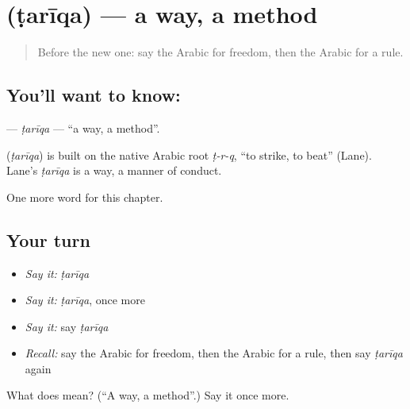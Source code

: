 \section[\texorpdfstring{\ar{طريقة} (ṭarīqa)}{طريقة (ṭarīqa)}]{ (ṭarīqa) — a way, a method}

\label{lesson:AR-C208-tariqa}



\begin{quote}
Before the new one: say the Arabic for freedom, then the Arabic for a rule.
\end{quote}

\subsection*{You'll want to know: }
\textbf{} — \emph{ṭarīqa} — \textquotedblleft{}a way, a method\textquotedblright{}.

\begin{cousinweb}
\textbf{} (\emph{ṭarīqa}) is built on the native Arabic root \emph{ṭ-r-q}, \textquotedblleft{}to strike, to beat\textquotedblright{} (Lane). Lane's \emph{ṭarīqa} is a way, a manner of conduct.
\end{cousinweb}

\begin{grammarlens}[title={What you've built}]
One more word for this chapter.
\end{grammarlens}

\subsection*{Your turn}
\begin{itemize}
\raggedright
  \item \emph{Say it:} \emph{ṭarīqa}
  \item \emph{Say it:} \emph{ṭarīqa}, once more
  \item \emph{Say it:} say \emph{ṭarīqa}
  \item \emph{Recall:} say the Arabic for freedom, then the Arabic for a rule, then say \emph{ṭarīqa} again
\end{itemize}

\begin{tcolorbox}[breakable,colback=teal!4,colframe=teal!35!black,title={Before you move on}]
What does  mean? (\textquotedblleft{}A way, a method\textquotedblright{}.) Say it once more.
\end{tcolorbox}
